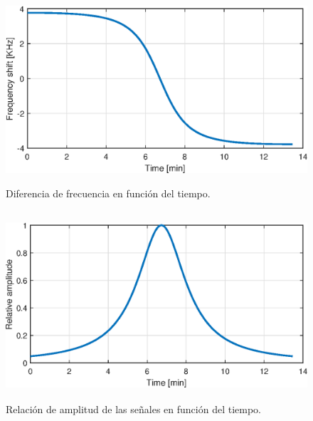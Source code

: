 \documentclass{article}
\newenvironment{standalone}{\begin{preview}}{\end{preview}}
\begin{document}
\begin{standalone}
  \begin{figure}[!htbp]
    \centering
    \includegraphics[width=\linewidth, height=70mm, keepaspectratio]{../images/t-frequency-shift.eps}
    \caption{Diferencia de frecuencia en función del tiempo.}
    \label{fig:t-frequency-shift}
  \end{figure}

  \begin{figure}[!htbp]
    \centering
    \includegraphics[width=\linewidth, height=70mm, keepaspectratio]{../images/t-relative-amplitude.eps}
    \caption{Relación de amplitud de las señales en función del tiempo.}
    \label{fig:t-relative-amplitude}
  \end{figure}




\end{standalone}
\end{document}
